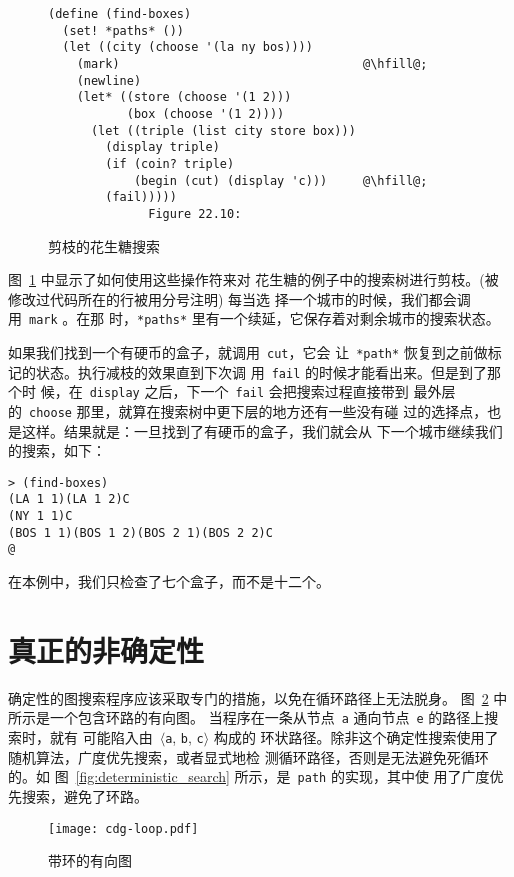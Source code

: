 \begin{figure}
\begin{lstlisting}[escapechar=\@]
(define (find-boxes)
  (set! *paths* ())
  (let ((city (choose '(la ny bos))))
    (mark)                                  @\hfill@;
    (newline)
    (let* ((store (choose '(1 2)))
           (box (choose '(1 2))))
      (let ((triple (list city store box)))
        (display triple)
        (if (coin? triple)
            (begin (cut) (display 'c)))     @\hfill@;
        (fail)))))
              Figure 22.10: 
\end{lstlisting}
\caption{剪枝的花生糖搜索}
\label{fig:pruned_chocoblob_search}
\end{figure}

图~\ref{fig:pruned_chocoblob_search} 中显示了如何使用这些操作符来对
花生糖的例子中的搜索树进行剪枝。(被修改过代码所在的行被用分号注明) 每当选
择一个城市的时候，我们都会调用~\texttt{mark} 。在那
时，\texttt{*paths*} 里有一个续延，它保存着对剩余城市的搜索状态。

如果我们找到一个有硬币的盒子，就调用~\texttt{cut}，它会
让~\texttt{*path*} 恢复到之前做标记的状态。执行减枝的效果直到下次调
用~\texttt{fail} 的时候才能看出来。但是到了那个时
候，在~\texttt{display} 之后，下一个~\texttt{fail} 会把搜索过程直接带到
最外层的~\texttt{choose} 那里，就算在搜索树中更下层的地方还有一些没有碰
过的选择点，也是这样。结果就是：一旦找到了有硬币的盒子，我们就会从
下一个城市继续我们的搜索，如下：

\begin{lstlisting}
> (find-boxes)
(LA 1 1)(LA 1 2)C
(NY 1 1)C
(BOS 1 1)(BOS 1 2)(BOS 2 1)(BOS 2 2)C
@
\end{lstlisting}
在本例中，我们只检查了七个盒子，而不是十二个。

\section{真正的非确定性}
\label{sec:true_nondeterminism}

确定性的图搜索程序应该采取专门的措施，以免在循环路径上无法脱身。
图~\ref{fig:a_directed_graph_with_a_loop} 中所示是一个包含环路的有向图。
当程序在一条从节点~\texttt{a} 通向节点~\texttt{e} 的路径上搜索时，就有
可能陷入由~$\langle$\texttt{a}, \texttt{b}, \texttt{c}$\rangle$ 构成的
环状路径。除非这个确定性搜索使用了随机算法，广度优先搜索，或者显式地检
测循环路径，否则是无法避免死循环的。如
图~\ref{fig:deterministic_search} 所示，是~\texttt{path} 的实现，其中使
用了广度优先搜索，避免了环路。

\begin{figure}
\begin{center}
\texttt{[image: cdg-loop.pdf]}
\end{center}
\caption{带环的有向图}
\label{fig:a_directed_graph_with_a_loop}
\end{figure}

